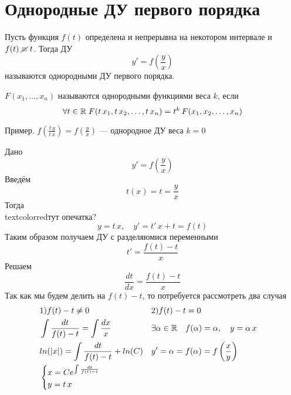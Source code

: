 \author{Tkachuk Andrei}

\section{Однородные ДУ первого порядка}

\begin{Def}
    Пусть функция $f(t)$ определена и непрерывна на некотором интервале и $f(t)\; \cancel{\equiv}\; t$. Тогда ДУ 
    \[
        y' = f\left(\frac{y}{x}\right)
    \]
    называются однородными ДУ первого порядка.
\end{Def}

\begin{Note}
    $F(x_1, \dots, x_n)$ называются однородными функциями веса $k$, если 
    \[
        \forall t \in \mathbb{R} \; F(t\,x_1, t\,x_2, \dots, t\,x_n) = t^k\,F(x_1, x_2, \dots, x_n)
    \]
    
    Пример. $f(\frac{t\,y}{t\,x}) = f(\frac{y}{x})$ --- однородное ДУ веса $k = 0$
\end{Note}
\begin{Note} 
    Дано 
    \[
        y' = f\left(\frac{y}{x}\right)
    \]
    Введём 
    \[
        t(x) = t = \frac{y}{x}
    \]
    Тогда
    \\textcolor{red}{тут опечатка?}
    \[
        y = t\,x, \quad y' = t'\,x + t = f(t)
    \]
    Таким образом получаем ДУ с разделяюмися переменными
    \[
        t' = \frac{f(t) - t}{x}
    \]
    Решаем
    \[
        \frac{dt}{dx} = \frac{f(t) - t}{x}
    \]
    Так как мы будем делить на $f(t) - t$, то потребуется рассмотреть два случая
    \begin{align*}
        &1) f(t) - t \neq 0& &2) f(t) - t = 0&\\
        &\int\frac{dt}{f(t) - t} = \int \frac{dx}{x}& &\exists\alpha \in \mathbb{R} \quad f(\alpha) = \alpha, \quad y = \alpha\,x&\\
        &ln(|x|) = \int \frac{dt}{f(t) - t} + ln(C)& &y'=\alpha= f(\alpha) = f\left(\frac{x}{y}\right)&\\
        &\begin{cases}
            x = Ce^{\int \frac{dt}{f(t) - t}}\\
            y = t\,x
        \end{cases}&
    \end{align*}
\end{Note}

